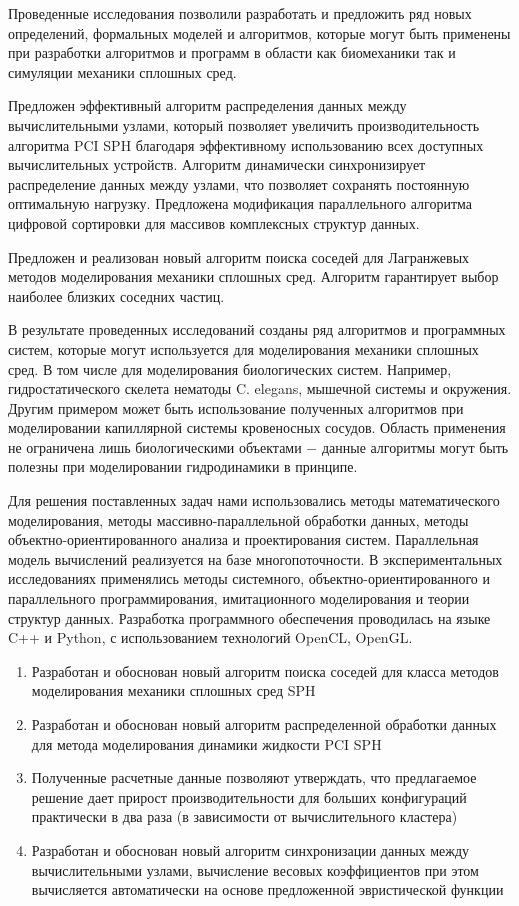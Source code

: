 {\novelty}
Проведенные исследования позволили разработать и предложить ряд новых определений, формальных моделей и алгоритмов, которые могут быть применены при разработки алгоритмов и программ в области как биомеханики так и симуляции механики сплошных сред. 

Предложен эффективный алгоритм распределения данных между вычислительными узлами, который позволяет увеличить производительность алгоритма PCI SPH благодаря эффективному использованию всех доступных вычислительных устройств. Алгоритм динамически синхронизирует распределение данных между узлами, что позволяет сохранять постоянную  оптимальную нагрузку. Предложена модификация параллельного алгоритма цифровой сортировки для массивов комплексных структур данных.

Предложен и реализован новый алгоритм поиска соседей для Лагранжевых методов моделирования механики сплошных сред. Алгоритм гарантирует выбор наиболее близких соседних частиц.

{\influence} В результате проведенных исследований созданы ряд алгоритмов и программных систем, которые могут используется для моделирования механики сплошных сред. В том числе для моделирования биологических систем. Например, гидростатического скелета нематоды C. elegans, мышечной системы и окружения. Другим примером может быть использование полученных алгоритмов при моделировании капиллярной системы кровеносных сосудов. Область применения не ограничена лишь биологическими объектами − данные алгоритмы могут быть полезны при моделировании гидродинамики в принципе. 

{\methods} Для решения поставленных задач нами использовались методы математического моделирования, методы массивно-параллельной обработки данных, методы объектно-ориентированного анализа и проектирования систем. Параллельная модель вычислений реализуется на базе многопоточности. В эксперимен­тальных исследованиях применялись методы системного, объектно-ориенти­рованного и параллельного программирования, имитационного моделирования и теории структур данных. Разработка программного обеспечения проводилась на языке C++ и Python, с использованием технологий OpenCL, OpenGL.

{}
\begin{enumerate}
  \item Разработан и обоснован новый алгоритм поиска соседей для класса методов моделирования механики сплошных сред SPH
  \item Разработан и обоснован новый алгоритм распределенной обработки данных для метода моделирования динамики жидкости PCI SPH
  \item Полученные расчетные данные позволяют утверждать, что предлагаемое решение дает прирост производительности для больших конфигураций практически в два раза (в зависимости от вычислительного кластера)
  \item Разработан и обоснован новый алгоритм синхронизации данных между вычислительными узлами, вычисление весовых коэффициентов при этом вычисляется автоматически на основе предложенной эвристической функции
\end{enumerate}

